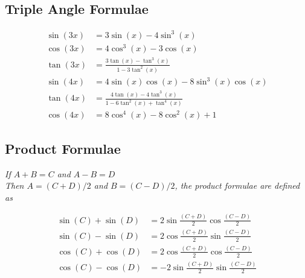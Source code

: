 \subsection{Triple Angle Formulae}
\begin{align*}
\sin(3x) &= 3\sin(x) - 4\sin^3(x) \\
\cos(3x) &= 4\cos^3(x) - 3\cos(x) \\
\tan(3x) &= \frac{3\tan(x) - \tan^3(x)}{1-3\tan^2(x)}\\
\sin(4x) &= 4\sin(x)\cos(x) - 8\sin^3(x)\cos(x)\\
\tan(4x) &= \frac{4\tan(x)-4\tan^3(x)}{1-6\tan^2(x)+\tan^4(x)}\\
\cos(4x) &= 8\cos^4(x) - 8\cos^2(x) + 1
\end{align*}


\subsection{Product Formulae}
\textit{If $A+B = C$ and $A-B = D$}\\
\textit{Then $A = (C+D)/2$ and $B = (C-D)/2$, the product formulae are defined as}

\begin{align*}
\sin(C) + \sin(D) &= 2\sin\frac{(C+D)}{2}\cos\frac{(C-D)}{2}\\
\sin(C) - \sin(D) &= 2\cos\frac{(C+D)}{2}\sin\frac{(C-D)}{2}\\
\cos(C) + \cos(D) &= 2\cos\frac{(C+D)}{2}\cos\frac{(C-D)}{2}\\
\cos(C) - \cos(D) &= -2\sin\frac{(C+D)}{2}\sin\frac{(C-D)}{2}
\end{align*}

